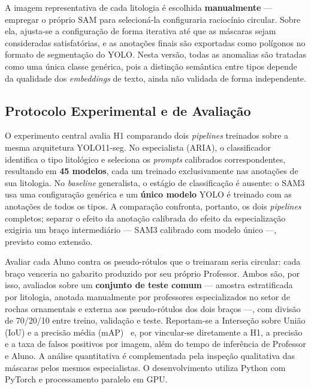 \documentclass[10pt,conference]{IEEEtran}
\begin{document}
A imagem representativa de cada litologia é escolhida \textbf{manualmente} --- empregar o próprio SAM para selecioná-la configuraria raciocínio circular. Sobre ela, ajusta-se a configuração de forma iterativa até que as máscaras sejam consideradas satisfatórias, e as anotações finais são exportadas como polígonos no formato de segmentação do YOLO. Nesta versão, todas as anomalias são tratadas como uma única classe genérica, pois a distinção semântica entre tipos depende da qualidade dos \textit{embeddings} de texto, ainda não validada de forma independente.

\subsection{Protocolo Experimental e de Avaliação}

O experimento central avalia H1 comparando dois \textit{pipelines} treinados sobre a mesma arquitetura YOLO11-seg. No especialista (ARIA), o classificador identifica o tipo litológico e seleciona os \textit{prompts} calibrados correspondentes, resultando em \textbf{45 modelos}, cada um treinado exclusivamente nas anotações de sua litologia. No \textit{baseline} generalista, o estágio de classificação é ausente: o SAM3 usa uma configuração genérica e um \textbf{único modelo} YOLO é treinado com as anotações de todos os tipos. A comparação confronta, portanto, os dois \textit{pipelines} completos; separar o efeito da anotação calibrada do efeito da especialização exigiria um braço intermediário --- SAM3 calibrado com modelo único ---, previsto como extensão.

Avaliar cada Aluno contra os pseudo-rótulos que o treinaram seria circular: cada braço venceria no gabarito produzido por seu próprio Professor. Ambos são, por isso, avaliados sobre um \textbf{conjunto de teste comum} --- amostra estratificada por litologia, anotada manualmente por professores especializados no setor de rochas ornamentais e externa aos pseudo-rótulos dos dois braços ---, com divisão de 70/20/10 entre treino, validação e teste. Reportam-se a Interseção sobre União (IoU) e a precisão média (mAP)~\cite{voc_everingham2010} e, por vincular-se diretamente a H1, a precisão e a taxa de falsos positivos por imagem, além do tempo de inferência de Professor e Aluno. A análise quantitativa é complementada pela inspeção qualitativa das máscaras pelos mesmos especialistas. O desenvolvimento utiliza Python com PyTorch e processamento paralelo em GPU.
\end{document}
